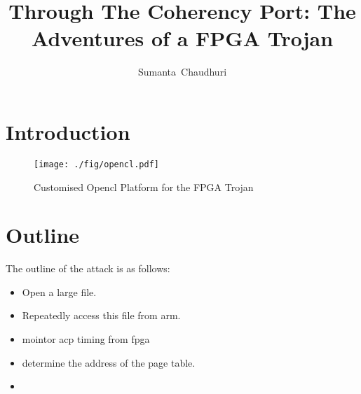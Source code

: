 \documentclass[10pt,journal,compsoc]{IEEEtran}
\begin{document}
\title{Through The Coherency Port: The Adventures of a FPGA Trojan}
\author{Sumanta~Chaudhuri}


\maketitle


\section{Introduction}

\begin{figure*}[!t]
\centering
\texttt{[image: ./fig/opencl.pdf]}
\caption{Customised Opencl Platform for the FPGA Trojan}
\label{fig_dlcs}
\end{figure*}

\section{Outline}
The outline of the attack is as follows:
\begin{itemize}
\item
Open a large file.
\item
Repeatedly access this file from arm.
\item
mointor acp timing from fpga
\item
determine the address of the page table.
\item

\end{itemize}
\end{document}
